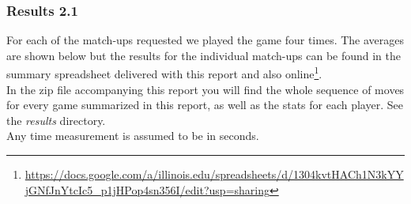 \documentclass[11pt]{article}
\begin{document}
\subsubsection*{Results 2.1}
For each of the match-ups requested we played the game four times. The averages are shown below but the results for the individual match-ups can be found in the summary spreadsheet delivered with this report and also online\footnote{\url{https://docs.google.com/a/illinois.edu/spreadsheets/d/1304kvtHACh1N3kYYjGNfJnYtcIc5_p1jHPop4sn356I/edit?usp=sharing}}.\\
In the zip file accompanying this report you will find the whole sequence of moves for every game summarized in this report, as well as the stats for each player. See the \textit{results} directory.\\
Any time measurement is assumed to be in seconds.\\
\end{document}
